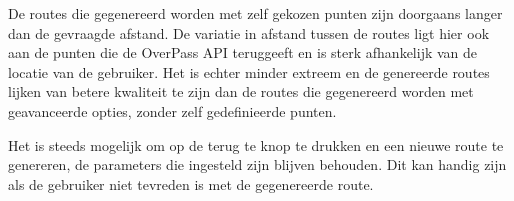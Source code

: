 \vspace{1cm}


De routes die gegenereerd worden met zelf gekozen punten zijn doorgaans langer dan de gevraagde afstand. 
De variatie in afstand tussen de routes ligt hier ook aan de punten die de OverPass API teruggeeft en is sterk afhankelijk van de locatie van de gebruiker. 
Het is echter minder extreem en de genereerde routes lijken van betere kwaliteit te zijn dan de routes die gegenereerd worden met geavanceerde opties, zonder zelf gedefinieerde punten.

\vspace{1cm}


Het is steeds mogelijk om op de terug te knop te drukken en een nieuwe route te genereren, de parameters die ingesteld zijn blijven behouden. Dit kan handig zijn als de gebruiker niet tevreden is met de gegenereerde route.







